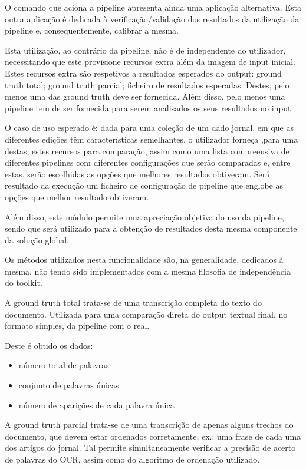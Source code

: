 O comando que aciona a pipeline apresenta ainda uma aplicação alternativa. Esta outra aplicação é dedicada à verificação/validação dos resultados da utilização da pipeline e, consequentemente, calibrar a mesma.

Esta utilização, ao contrário da pipeline, não é de independente do utilizador, necessitando que este provisione recursos extra além da imagem de input inicial. Estes recursos extra são respetivos a resultados esperados do output: ground truth total; ground truth parcial; ficheiro de resultados esperadas. Destes, pelo menos uma das ground truth deve ser fornecida. Além disso, pelo menos uma pipeline tem de ser fornecida para serem analisados os seus resultados no input.

O caso de uso esperado é: dada para uma coleção de um dado jornal, em que as diferentes edições têm características semelhantes, o utilizador forneça ,para uma destas, estes recursos para comparação, assim como uma lista compreensiva de diferentes pipelines com diferentes configurações que serão comparadas e, entre estas, serão escolhidas as opções que melhores resultados obtiveram. Será resultado da execução um ficheiro de configuração de pipeline que englobe as opções que melhor resultado obtiveram.

Além disso, este módulo permite uma apreciação objetiva do uso da pipeline, sendo que será utilizado para a obtenção de resultados desta mesma componente da solução global.

Os métodos utilizados nesta funcionalidade são, na generalidade, dedicados à mesma, não tendo sido implementados com a mesma filosofia de independência do toolkit.



A ground truth total trata-se de uma transcrição completa do texto do documento. Utilizada para uma comparação direta do output textual final, no formato simples, da pipeline com o real.

Deste é obtido os dados: 

\begin{itemize}\setlength\itemsep{-0.8em}
	\item número total de palavras
	\item conjunto de palavras únicas
	\item número de aparições de cada palavra única
\end{itemize}


A ground truth parcial trata-se de uma transcrição de apenas alguns trechos do documento, que devem estar ordenados corretamente, ex.: uma frase de cada uma dos artigos do jornal. Tal permite simultaneamente verificar a precisão de acerto de palavras do OCR, assim como do algoritmo de ordenação utilizado.

